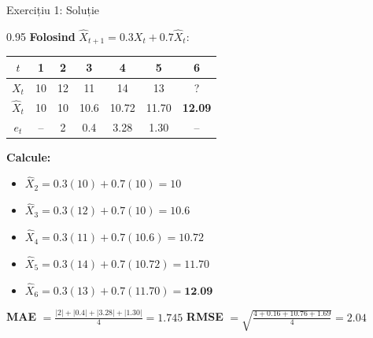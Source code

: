 \documentclass[9pt, aspectratio=169, t]{beamer}
\begin{document}
\begin{frame}{Exercițiu 1: Soluție}
    \begin{cminipage}{0.95\textwidth}
    \textbf{Folosind} $\hat{X}_{t+1} = 0.3 X_t + 0.7 \hat{X}_t$:

    \vspace{0.2cm}

    \begin{center}
    \small
    \begin{tabular}{c|ccccc|c}
        $t$ & 1 & 2 & 3 & 4 & 5 & 6\\
        \hline
        $X_t$ & 10 & 12 & 11 & 14 & 13 & ?\\
        $\hat{X}_t$ & 10 & 10 & 10.6 & 10.72 & 11.70 & \textbf{12.09}\\
        $e_t$ & -- & 2 & 0.4 & 3.28 & 1.30 & --\\
    \end{tabular}
    \end{center}

    \vspace{0.2cm}

    \textbf{Calcule:}
    \begin{itemize}\setlength{\itemsep}{0pt}
        \item $\hat{X}_2 = 0.3(10) + 0.7(10) = 10$
        \item $\hat{X}_3 = 0.3(12) + 0.7(10) = 10.6$
        \item $\hat{X}_4 = 0.3(11) + 0.7(10.6) = 10.72$
        \item $\hat{X}_5 = 0.3(14) + 0.7(10.72) = 11.70$
        \item $\hat{X}_6 = 0.3(13) + 0.7(11.70) = \textbf{12.09}$
    \end{itemize}

    \vspace{0.2cm}

    \textbf{MAE} $= \frac{|2|+|0.4|+|3.28|+|1.30|}{4} = 1.745$ \quad \textbf{RMSE} $= \sqrt{\frac{4+0.16+10.76+1.69}{4}} = 2.04$
    \end{cminipage}
\end{frame}
\end{document}
